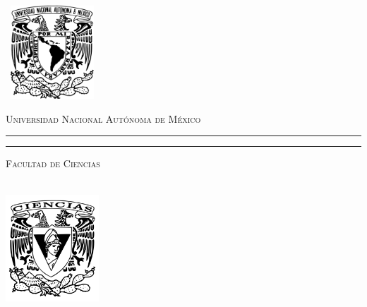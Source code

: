 \documentclass[letterpaper,12pt]{book}
\begin{document}
    \begin{titlepage}
        \thispagestyle{empty}
        \begin{minipage}[c][0.17\textheight][c]{0.25\textwidth}
            \begin{center}
                \includegraphics[width=3.5cm, height=3.5cm]{Escudo-UNAM.pdf}
            \end{center}
        \end{minipage}
        \begin{minipage}[c][0.195\textheight][t]{0.75\textwidth}
            \begin{center}
                \vspace{0.3cm}
                \textsc{\large Universidad Nacional Aut\'onoma de M\'exico}\\[0.5cm]
                \vspace{0.3cm}
                \hrule height2.5pt
                \vspace{.2cm}
                \hrule height1pt
                \vspace{.8cm}
                \textsc{Facultad de Ciencias}\\[0.7cm] %
            \end{center}
        \end{minipage}

        \begin{minipage}[c][0.81\textheight][t]{0.25\textwidth}
            \vspace*{5mm}
            \begin{center}
                \hskip2.0mm
                \vrule width1pt height13cm 
                \vspace{5mm}
                \hskip2pt
                \vrule width2.5pt height13cm
                \hskip2mm
                \vrule width1pt height13cm \\
                \vspace{5mm}
                \includegraphics[height=4.0cm]{Escudo-facultad-ciencias.png}
            \end{center}
        \end{minipage}
        \begin{minipage}[c][0.81\textheight][t]{0.75\textwidth}
            \begin{center}
                \vspace{1cm}


\end{center}
\end{minipage}
\end{titlepage}
\end{document}

